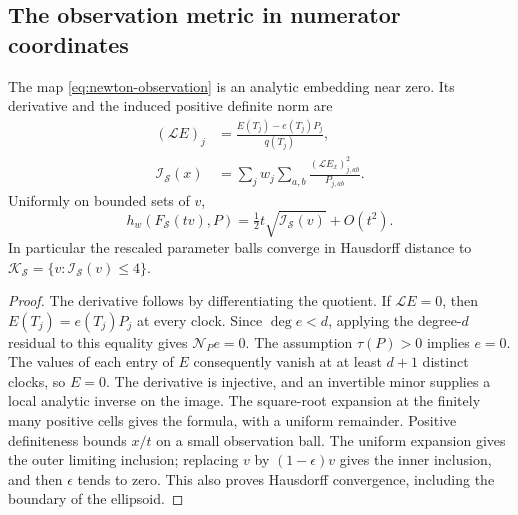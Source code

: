 \subsection{The observation metric in numerator coordinates}
\begin{lemma}\label{lem:rational-chart-v93}
The map \eqref{eq:newton-observation} is an analytic embedding near
zero. Its derivative and the induced positive definite norm are
\begin{align}
 (\mathcal L E)_j&=\frac{E(T_j)-e(T_j)P_j}{q(T_j)},\nonumber\\
 \mathcal I_{\mathcal S}(x)
 &=\sum_jw_j\sum_{a,b}
                   \frac{(\mathcal L E_x)_{j,ab}^2}{P_{j,ab}}.
                                                        \label{eq:newton-metric}
\end{align}
Uniformly on bounded sets of $v$,
\[
 h_w(F_{\mathcal S}(tv),P)
       =\tfrac12 t\sqrt{\mathcal I_{\mathcal S}(v)}+O(t^2).
\]
In particular the rescaled parameter balls converge in Hausdorff
distance to $\mathcal K_{\mathcal S}=
\{v:\mathcal I_{\mathcal S}(v)\le4\}$.
\end{lemma}
\begin{proof}
The derivative follows by differentiating the quotient. If
$\mathcal L E=0$, then $E(T_j)=e(T_j)P_j$ at every clock.
Since $\deg e<d$, applying the degree-$d$ residual to this equality
gives $\mathcal N_P e=0$. The assumption $\tau(P)>0$ implies $e=0$.
The values of each entry of $E$ consequently vanish at at least $d+1$
distinct clocks, so $E=0$. The derivative is injective, and an
invertible minor supplies a local analytic inverse on the image.
The square-root expansion at the finitely many positive cells gives
the formula, with a uniform remainder. Positive definiteness bounds
$x/t$ on a small observation ball. The uniform expansion gives the
outer limiting inclusion; replacing $v$ by $(1-\epsilon)v$ gives
the inner inclusion, and then $\epsilon$ tends to zero. This also
proves Hausdorff convergence, including the boundary of the ellipsoid.
\end{proof}

